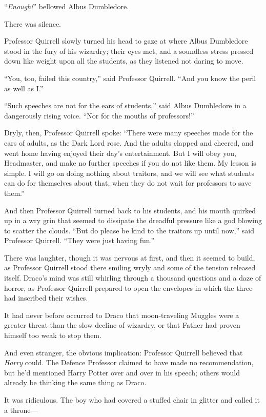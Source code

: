 “\emph{Enough!}” bellowed Albus Dumbledore.

There was silence.

Professor Quirrell slowly turned his head to gaze at where Albus Dumbledore
stood in the fury of his wizardry; their eyes met, and a soundless stress
pressed down like weight upon all the students, as they listened not daring to
move.

“You, too, failed this country,” said Professor Quirrell. “And you know the
peril as well as I.”

“Such speeches are not for the ears of students,” said Albus Dumbledore in a
dangerously rising voice. “Nor for the mouths of professors!”

Dryly, then, Professor Quirrell spoke: “There were many speeches made for the
ears of adults, as the Dark Lord rose. And the adults clapped and cheered, and
went home having enjoyed their day’s entertainment. But I will obey you,
Headmaster, and make no further speeches if you do not like them. My lesson is
simple. I will go on doing nothing about traitors, and we will see what
students can do for themselves about that, when they do not wait for professors
to save them.”

And then Professor Quirrell turned back to his students, and his mouth quirked
up in a wry grin that seemed to dissipate the dreadful pressure like a god
blowing to scatter the clouds. “But do please be kind to the traitors up until
now,” said Professor Quirrell. “They were just having fun.”

There was laughter, though it was nervous at first, and then it seemed to
build, as Professor Quirrell stood there smiling wryly and some of the tension
released itself.
\later
Draco’s mind was still whirling through a thousand questions and a daze of
horror, as Professor Quirrell prepared to open the envelopes in which the three
had inscribed their wishes.

It had never before occurred to Draco that moon-traveling Muggles were a
greater threat than the slow decline of wizardry, or that Father had proven
himself too weak to stop them.

And even stranger, the obvious implication: Professor Quirrell believed that
\emph{Harry} could. The Defence Professor claimed to have made no
recommendation, but he’d mentioned Harry Potter over and over in his speech;
others would already be thinking the same thing as Draco.

It was ridiculous. The boy who had covered a stuffed chair in glitter and
called it a throne—

